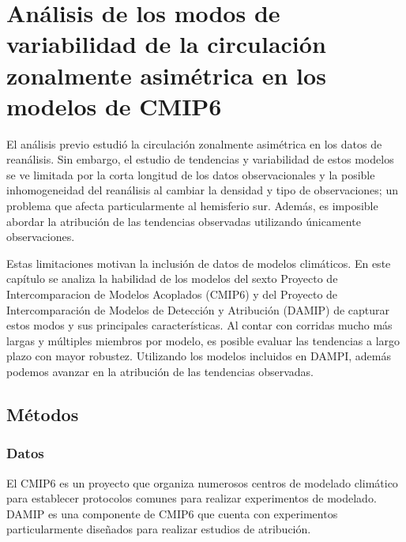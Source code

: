 \documentclass[12pt,oneside,a4paper]{reedthesis}
\begin{document}
\hypertarget{anuxe1lisis-de-los-modos-de-variabilidad-de-la-circulaciuxf3n-zonalmente-asimuxe9trica-en-los-modelos-de-cmip6}{%
\chapter{Análisis de los modos de variabilidad de la circulación zonalmente asimétrica en los modelos de CMIP6}\label{anuxe1lisis-de-los-modos-de-variabilidad-de-la-circulaciuxf3n-zonalmente-asimuxe9trica-en-los-modelos-de-cmip6}}

El análisis previo estudió la circulación zonalmente asimétrica en los datos de reanálisis.
Sin embargo, el estudio de tendencias y variabilidad de estos modelos se ve limitada por la corta longitud de los datos observacionales y la posible inhomogeneidad del reanálisis al cambiar la densidad y tipo de observaciones; un problema que afecta particularmente al hemisferio sur.
Además, es imposible abordar la atribución de las tendencias observadas utilizando únicamente observaciones.

Estas limitaciones motivan la inclusión de datos de modelos climáticos.
En este capítulo se analiza la habilidad de los modelos del sexto Proyecto de Intercomparacion de Modelos Acoplados (CMIP6) y del Proyecto de Intercomparación de Modelos de Detección y Atribución (DAMIP) de capturar estos modos y sus principales características.
Al contar con corridas mucho más largas y múltiples miembros por modelo, es posible evaluar las tendencias a largo plazo con mayor robustez.
Utilizando los modelos incluidos en DAMPI, además podemos avanzar en la atribución de las tendencias observadas.

\hypertarget{muxe9todos-4}{%
\section{Métodos}\label{muxe9todos-4}}

\hypertarget{datos-4}{%
\subsection{Datos}\label{datos-4}}

El CMIP6 es un proyecto que organiza numerosos centros de modelado climático para establecer protocolos comunes para realizar experimentos de modelado.
DAMIP es una componente de CMIP6 que cuenta con experimentos particularmente diseñados para realizar estudios de atribución.
\end{document}
